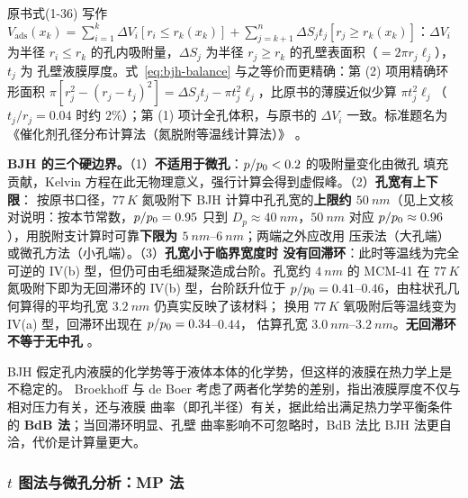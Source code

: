 原书式(1-36) 写作
$V_{\mathrm{ads}}(x_k)=\sum_{i=1}^{k}\Delta V_i\left[r_i\le r_k(x_k)\right]
+\sum_{j=k+1}^{n}\Delta S_j t_j\left[r_j\ge r_k(x_k)\right]$：$\Delta V_i$ 为半径 $r_i\le r_k$
的孔内吸附量，$\Delta S_j$ 为半径 $r_j\ge r_k$ 的孔壁表面积（$=2\pi r_j\ell_j$），$t_j$ 为
孔壁液膜厚度。式~\eqref{eq:bjh-balance} 与之等价而更精确：第 (2) 项用精确环形面积
$\pi[r_j^{2}-(r_j-t_j)^{2}]=\Delta S_jt_j-\pi t_j^{2}\ell_j$，比原书的薄膜近似少算
$\pi t_j^{2}\ell_j$（$t_j/r_j=0.04$ 时约 $2\%$）；第 (1) 项计全孔体积，与原书的 $\Delta V_i$
一致。标准题名为《催化剂孔径分布计算法（氮脱附等温线计算法）》
。

\begin{keycond}
\textbf{BJH 的三个硬边界。}（1）\textbf{不适用于微孔}：$p/p_{0}<0.2$ 的吸附量变化由微孔
填充贡献，Kelvin 方程在此无物理意义，强行计算会得到虚假峰。（2）\textbf{孔宽有上下限}：
按原书口径，$77\,\unit{K}$ 氮吸附下 BJH 计算中孔孔宽的\textbf{上限约
$\qty{50}{nm}$}（见上文核对说明：按本节常数，$p/p_{0}=0.95$ 只到
$D_p\approx\qty{40}{nm}$，$\qty{50}{nm}$ 对应 $p/p_{0}\approx0.96$），用脱附支计算时可靠\textbf{下限为 $\qtyrange{5}{6}{nm}$}；两端之外应改用
压汞法（大孔端）或微孔方法（小孔端）。（3）\textbf{孔宽小于临界宽度时
没有回滞环}：此时等温线为完全可逆的 IV(b) 型，但仍可由毛细凝聚造成台阶。孔宽约
$\qty{4}{nm}$ 的 MCM-41 在 $77\,\unit{K}$ 氮吸附下即为无回滞环的 IV(b) 型，台阶跃升位于
$p/p_{0}=0.41$--$0.46$，由柱状孔几何算得的平均孔宽 $\qty{3.2}{nm}$ 仍真实反映了该材料；
换用 $77\,\unit{K}$ 氧吸附后等温线变为 IV(a) 型，回滞环出现在 $p/p_{0}=0.34$--$0.44$，
估算孔宽 $\qtyrange{3.0}{3.2}{nm}$。\textbf{无回滞环不等于无中孔}
。
\end{keycond}

BJH 假定孔内液膜的化学势等于液体本体的化学势，但这样的液膜在热力学上是不稳定的。
Broekhoff 与 de Boer 考虑了两者化学势的差别，指出液膜厚度不仅与相对压力有关，还与液膜
曲率（即孔半径）有关，据此给出满足热力学平衡条件的 \textbf{BdB 法}；当回滞环明显、孔壁
曲率影响不可忽略时，BdB 法比 BJH 法更自洽，代价是计算量更大。

\subsubsection{$t$ 图法与微孔分析：MP 法}

